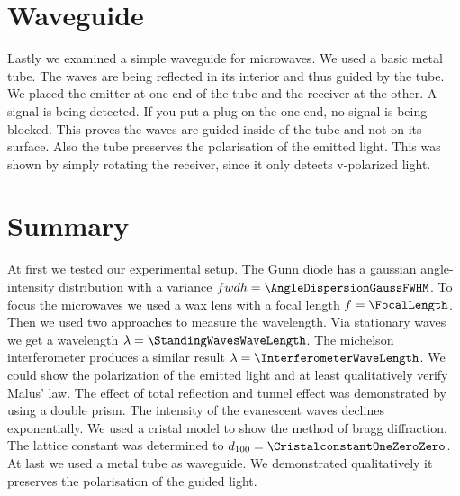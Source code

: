 \documentclass[a4paper,10pt,twocolumn]{article}
\begin{document}
    \section{Waveguide}
    
    Lastly we examined a simple waveguide for microwaves.
    We used a basic metal tube.
    The waves are being reflected in its interior and thus guided by the tube.
    We placed the emitter at one end of the tube and the receiver at the other.
    A signal is being detected.
    If you put a plug on the one end, no signal is being blocked.
    This proves the waves are guided inside of the tube and not on its surface.
    Also the tube preserves the polarisation of the emitted light.
    This was shown by simply rotating the receiver, since it only detects v-polarized light.

    \section{Summary}
    
    At first we tested our experimental setup.
    The Gunn diode has a gaussian angle-intensity distribution with a variance $fwdh = \AngleDispersionGaussFWHM$.
    To focus the microwaves we used a wax lens with a focal length $f = \FocalLength$.
    Then we used two approaches to measure the wavelength. 
    Via stationary waves we get a wavelength $\lambda = \StandingWavesWaveLength$.
    The michelson interferometer produces a similar result $\lambda = \InterferometerWaveLength $.
    We could show the polarization of the emitted light and at least qualitatively verify Malus' law. 
    The effect of total reflection and tunnel effect was demonstrated by using a double prism.
    The intensity of the evanescent waves declines exponentially.
    We used a cristal model to show the method of bragg diffraction.
    The lattice constant was determined to $d_{100} = \CristalconstantOneZeroZero$.
    At last we used a metal tube as waveguide.
    We demonstrated qualitatively it preserves the polarisation of the guided light.
    
\end{document}

